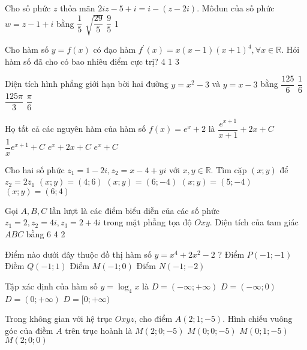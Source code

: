 \begin{ex} %
 Cho số phức $z$ thỏa mãn $2 i z-5+i=i-(z-2 i)$. Môđun của số phức $w=z-1+i$ bằng
\choice
{$\dfrac{1}{5}$}
{$\sqrt{\dfrac{29}{5}}$}
{\True$\dfrac{9}{5}$}
{1}
\end{ex}

\begin{ex} %
 Cho hàm số $y=f(x)$ có đạo hàm $f^{\prime}(x)=x(x-1)(x+1)^{4}, \forall x \in \mathbb{R}$. Hỏi hàm số đã cho có bao nhiêu điểm cực trị?
\choice
{}
{4}
{1}
{3}
\end{ex}

\begin{ex} %
 Diện tích hình phẳng giới hạn bời hai đường $y=x^{2}-3$ và $y=x-3$ bằng
\choice
{$\dfrac{125}{6}$}
{\True$\dfrac{1}{6}$}
{$\dfrac{125 \pi}{3}$}
{$\dfrac{\pi}{6}$}
\end{ex}

\begin{ex}%
 Họ tất cả các nguyên hàm của hàm số $f(x)=e^{x}+2$ là
\choice
{\True$\dfrac{e^{x+1}}{x+1}+2 x+C$}
{$\dfrac{1}{x} e^{x+1}+C$}
{$e^{x}+2 x+C$}
{$e^{x}+C$}
\end{ex}

\begin{ex} %
 Cho hai số phức $z_{1}=1-2 i, z_{2}=x-4+y i$ với $x, y \in \mathbb{R}$. Tìm cặp $(x; y)$ để $z_{2}=2 \bar{z}_{1}$
\choice
{\True $(x; y)=(4; 6)$}
{$(x; y)=(6;-4)$}
{$(x; y)=(5;-4)$}
{$(x; y)=(6; 4)$}
\end{ex}

\begin{ex} %
 Gọi $A, B, C$ lần lượt là các điểm biểu diễn của các số phức $z_{1}=2, z_{2}=4 i, z_{3}=2+4 i$ trong mặt phẳng tọa độ $O x y$. Diện tích của tam giác $A B C$ bằng
\choice
{}
{6}
{4}
{2}
\end{ex}

\begin{ex} %
 Điểm nào dưới đây thuộc đồ thị hàm số $y=x^{4}+2 x^{2}-2$ ?
\choice
{Điểm $P(-1;-1)$}
{\True Điềm $Q(-1; 1)$}
{Điểm $M(-1; 0)$}
{Điểm $N(-1;-2)$}
\end{ex}

\begin{ex} %
 Tập xác định của hàm số $y=\log _{4} x$ là
\choice
{$D=(-\infty;+\infty)$}
{$D=(-\infty; 0)$}
{\True $D=(0;+\infty)$}
{$D=[0;+\infty)$}
\end{ex}

\begin{ex} %
 Trong không gian với hệ trục $O x y z$, cho điểm $A(2; 1;-5)$. Hình chiếu vuông góc của điềm $A$ trên trục hoành là
\choice
{$M(2; 0;-5)$}
{$M(0; 0;-5)$}
{$M(0; 1;-5)$}
{\True $M(2; 0; 0)$}
\end{ex}

